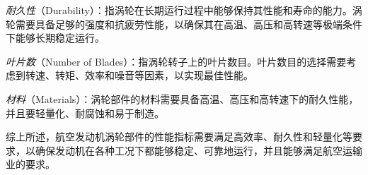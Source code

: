 \documentclass{MyLatex}
\begin{document}
\emph{耐久性}（Durability）：指涡轮在长期运行过程中能够保持其性能和寿命的能力。涡轮需要具备足够的强度和抗疲劳性能，以确保其在高温、高压和高转速等极端条件下能够长期稳定运行。

\emph{叶片数}（Number of Blades）：指涡轮转子上的叶片数目。叶片数目的选择需要考虑到转速、转矩、效率和噪音等因素，以实现最佳性能。

\emph{材料}（Materials）：涡轮部件的材料需要具备高温、高压和高转速下的耐久性能，并且要轻量化、耐腐蚀和易于制造。

综上所述，航空发动机涡轮部件的性能指标需要满足高效率、耐久性和轻量化等要求，以确保发动机在各种工况下都能够稳定、可靠地运行，并且能够满足航空运输业的要求。





\end{document}
